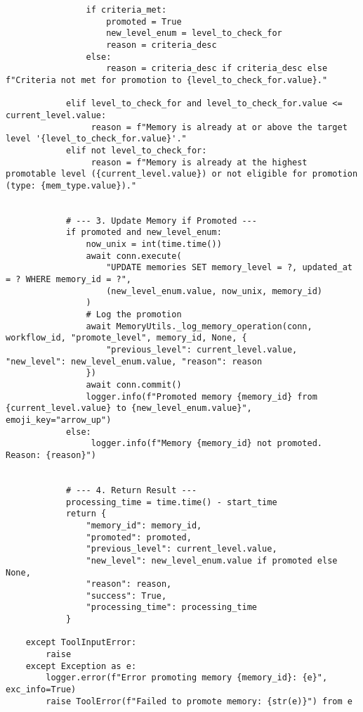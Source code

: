 \documentclass[12pt,a4paper]{article}
\begin{document}
\begin{pageablecode}
\begin{verbatim}
                if criteria_met:
                    promoted = True
                    new_level_enum = level_to_check_for
                    reason = criteria_desc
                else:
                    reason = criteria_desc if criteria_desc else f"Criteria not met for promotion to {level_to_check_for.value}."

            elif level_to_check_for and level_to_check_for.value <= current_level.value:
                 reason = f"Memory is already at or above the target level '{level_to_check_for.value}'."
            elif not level_to_check_for:
                 reason = f"Memory is already at the highest promotable level ({current_level.value}) or not eligible for promotion (type: {mem_type.value})."


            # --- 3. Update Memory if Promoted ---
            if promoted and new_level_enum:
                now_unix = int(time.time())
                await conn.execute(
                    "UPDATE memories SET memory_level = ?, updated_at = ? WHERE memory_id = ?",
                    (new_level_enum.value, now_unix, memory_id)
                )
                # Log the promotion
                await MemoryUtils._log_memory_operation(conn, workflow_id, "promote_level", memory_id, None, {
                    "previous_level": current_level.value, "new_level": new_level_enum.value, "reason": reason
                })
                await conn.commit()
                logger.info(f"Promoted memory {memory_id} from {current_level.value} to {new_level_enum.value}", emoji_key="arrow_up")
            else:
                 logger.info(f"Memory {memory_id} not promoted. Reason: {reason}")


            # --- 4. Return Result ---
            processing_time = time.time() - start_time
            return {
                "memory_id": memory_id,
                "promoted": promoted,
                "previous_level": current_level.value,
                "new_level": new_level_enum.value if promoted else None,
                "reason": reason,
                "success": True,
                "processing_time": processing_time
            }

    except ToolInputError:
        raise
    except Exception as e:
        logger.error(f"Error promoting memory {memory_id}: {e}", exc_info=True)
        raise ToolError(f"Failed to promote memory: {str(e)}") from e


\end{verbatim}
\end{pageablecode}
\end{document}
